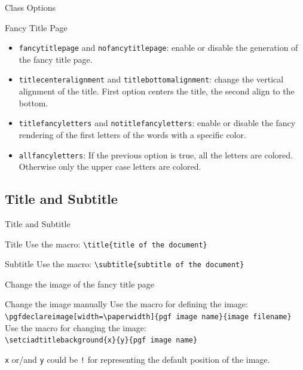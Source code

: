 \documentclass[english,sectioncirclenumberstyle]{ciadbeamer}
\begin{document}
\begin{frame}[t]{Class Options \insertcontinuationtext}
	\begin{block}{Fancy Title Page}
		\begin{itemize}
		\item \texttt{fancytitlepage} and \texttt{nofancytitlepage}: enable or disable the generation of the fancy title page.
		\item \texttt{titlecenteralignment} and \texttt{titlebottomalignment}: change the vertical alignment of the title. First option centers the title, the second align to the bottom.
		\item \texttt{titlefancyletters} and \texttt{notitlefancyletters}: enable or disable the fancy rendering of the first letters of the words with a specific color.
		\item \texttt{allfancyletters}: If the previous option is true, all the letters are colored. Otherwise only the upper case letters are colored.
		\end{itemize}
	\end{block}
\end{frame}

\subsection{Title and Subtitle}

\begin{frame}{Title and Subtitle}
	\begin{block}{Title}
		Use the macro: \texttt{{\textbackslash}title\{title of the document\}}
	\end{block}
	\vfill
	\begin{block}{Subtitle}
		Use the macro: \texttt{{\textbackslash}subtitle\{subtitle of the document\}}
	\end{block}
	\vfill
\end{frame}

\begin{frame}{Change the image of the fancy title page}
	\begin{block}{Change the image manually}
		Use the macro for defining the image: \\
		{\smaller\texttt{{\textbackslash}pgfdeclareimage[width={\textbackslash}paperwidth]\{pgf image name\}\{image filename\}}} \\[.5cm]
		Use the macro for changing the image: \\
		{\smaller\texttt{{\textbackslash}setciadtitlebackground\{x\}\{y\}\{pgf image name\}}}
	\end{block}
	\texttt{x} or/and \texttt{y} could be \texttt{\string!} for representing the default position of the image.
\end{frame}
\end{document}
